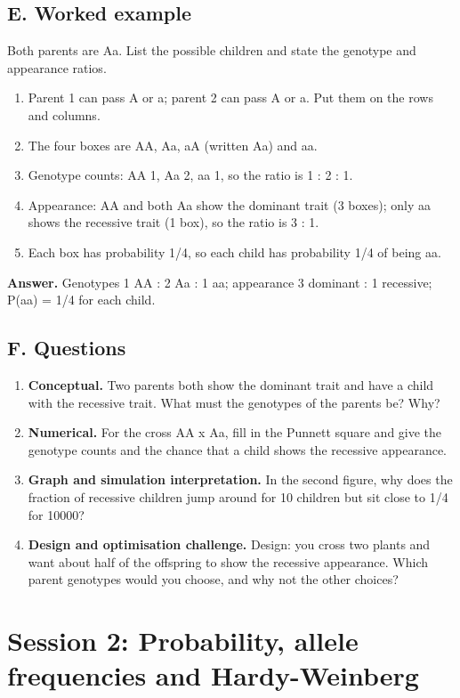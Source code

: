 \documentclass[11pt,a4paper]{article}
\begin{document}
\subsection*{E. Worked example}
Both parents are Aa. List the possible children and state the genotype and appearance ratios.
\begin{enumerate}[nosep]
\item Parent 1 can pass A or a; parent 2 can pass A or a. Put them on the rows and columns.
\item The four boxes are AA, Aa, aA (written Aa) and aa.
\item Genotype counts: AA 1, Aa 2, aa 1, so the ratio is 1 : 2 : 1.
\item Appearance: AA and both Aa show the dominant trait (3 boxes); only aa shows the recessive trait (1 box), so the ratio is 3 : 1.
\item Each box has probability 1/4, so each child has probability 1/4 of being aa.
\end{enumerate}
\textbf{Answer.} Genotypes 1 AA : 2 Aa : 1 aa; appearance 3 dominant : 1 recessive; P(aa) = 1/4 for each child.

\subsection*{F. Questions}
\begin{enumerate}[nosep]
\item \textbf{Conceptual.} Two parents both show the dominant trait and have a child with the recessive trait. What must the genotypes of the parents be? Why?
\item \textbf{Numerical.} For the cross AA x Aa, fill in the Punnett square and give the genotype counts and the chance that a child shows the recessive appearance.
\item \textbf{Graph and simulation interpretation.} In the second figure, why does the fraction of recessive children jump around for 10 children but sit close to 1/4 for 10000?
\item \textbf{Design and optimisation challenge.} Design: you cross two plants and want about half of the offspring to show the recessive appearance. Which parent genotypes would you choose, and why not the other choices?
\end{enumerate}

\section{Session 2: Probability, allele frequencies and Hardy-Weinberg}
\end{document}

